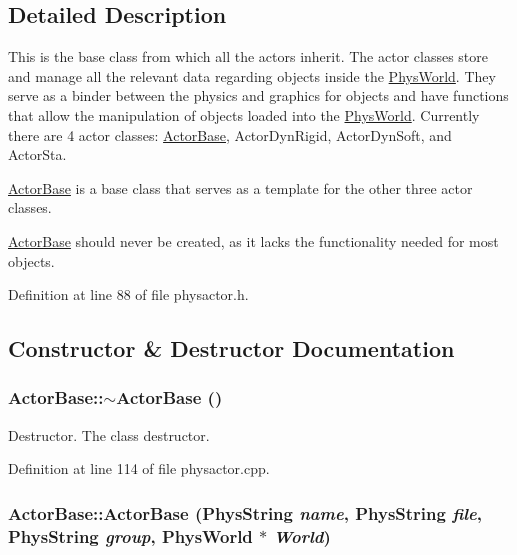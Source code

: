 \subsection{Detailed Description}
This is the base class from which all the actors inherit. The actor classes store and manage all the relevant data regarding objects inside the \hyperlink{classPhysWorld}{PhysWorld}. They serve as a binder between the physics and graphics for objects and have functions that allow the manipulation of objects loaded into the \hyperlink{classPhysWorld}{PhysWorld}. Currently there are 4 actor classes: \hyperlink{classActorBase}{ActorBase}, ActorDynRigid, ActorDynSoft, and ActorSta. \par
 \hyperlink{classActorBase}{ActorBase} is a base class that serves as a template for the other three actor classes. \par
 \hyperlink{classActorBase}{ActorBase} should never be created, as it lacks the functionality needed for most objects. 

Definition at line 88 of file physactor.h.

\subsection{Constructor \& Destructor Documentation}
\hypertarget{classActorBase_a6fd984c46b3232c2522adb44be4dedb7}{
\subsubsection[{$\sim$ActorBase}]{\setlength{\rightskip}{0pt plus 5cm}ActorBase::$\sim$ActorBase ()}}
\label{dd/d7b/classActorBase_a6fd984c46b3232c2522adb44be4dedb7}


Destructor. The class destructor. 

Definition at line 114 of file physactor.cpp.\hypertarget{classActorBase_a673d963aa7a99475cb03250c010dfa15}{
\subsubsection[{ActorBase}]{\setlength{\rightskip}{0pt plus 5cm}ActorBase::ActorBase (PhysString {\em name}, \/  PhysString {\em file}, \/  PhysString {\em group}, \/  {\bf PhysWorld} $\ast$ {\em World})}}
\label{dd/d7b/classActorBase_a673d963aa7a99475cb03250c010dfa15}


